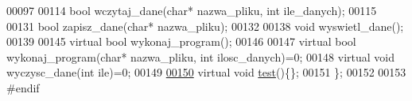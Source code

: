 \begin{DoxyCode}
00097 
00114   \textcolor{keywordtype}{bool} wczytaj\_dane(\textcolor{keywordtype}{char}* nazwa\_pliku, \textcolor{keywordtype}{int} ile\_danych);
00115 
00131  \textcolor{keywordtype}{bool} zapisz\_dane(\textcolor{keywordtype}{char}* nazwa\_pliku);
00132 
00138   \textcolor{keywordtype}{void} wyswietl\_dane();
00139 
00145   \textcolor{keyword}{virtual} \textcolor{keywordtype}{bool} wykonaj\_program();
00146 
00147   \textcolor{keyword}{virtual} \textcolor{keywordtype}{bool} wykonaj\_program(\textcolor{keywordtype}{char}* nazwa\_pliku, \textcolor{keywordtype}{int} ilosc\_danych)=0;
00148   \textcolor{keyword}{virtual} \textcolor{keywordtype}{void} wyczysc\_dane(\textcolor{keywordtype}{int} ile)=0;
00149 
\hypertarget{program_8hh_source_l00150}{}\hyperlink{class_program_ae866e995ea153f83031107c194f604e5}{00150}   \textcolor{keyword}{virtual} \textcolor{keywordtype}{void} \hyperlink{class_program_ae866e995ea153f83031107c194f604e5}{test}()\{\};
00151 \};
00152 
00153 \textcolor{preprocessor}{#endif}
\end{DoxyCode}
